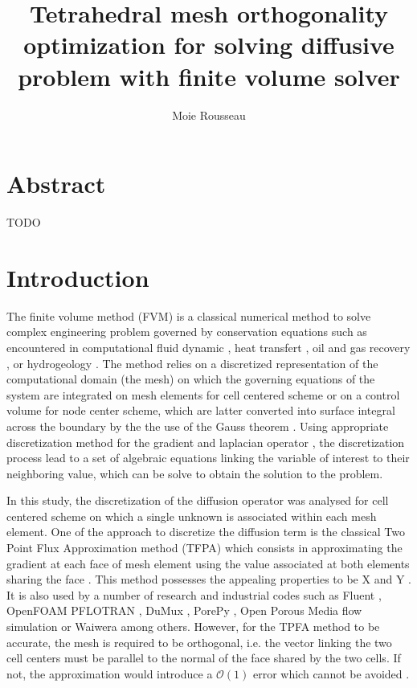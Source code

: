 \documentclass[11pt]{article}
\title{\textbf{Tetrahedral mesh orthogonality optimization for solving diffusive problem with finite volume solver}}
\author{Moie Rousseau}
\date{}
\begin{document}
\maketitle
\thispagestyle{empty}

\section*{Abstract}

TODO

\section{Introduction}


The finite volume method (FVM) is a classical numerical method to solve complex engineering problem governed by conservation equations such as encountered in computational fluid dynamic \cite{}, heat transfert \cite{}, oil and gas recovery \cite{}, or hydrogeology \cite{}.
The method relies on a discretized representation of the computational domain (the mesh) on which the governing equations of the system are integrated on mesh elements for cell centered scheme or on a control volume for node center scheme, which are latter converted into surface integral across the boundary by the the use of the Gauss theorem \cite{}. %
Using appropriate discretization method for the gradient and laplacian operator \cite{}, the discretization process lead to a set of algebraic equations linking the variable of interest to their neighboring value, which can be solve to obtain the solution to the problem.

In this study, the discretization of the diffusion operator was analysed for cell centered scheme on which a single unknown is associated within each mesh element.
One of the approach to discretize the diffusion term is the classical Two Point Flux Approximation method (TFPA) which consists in approximating the gradient at each face of mesh element using the value associated at both elements sharing the face \cite{moukalled_finite_2016, ferziger_computational_2020}.
This method possesses the appealing properties to be X and Y \cite{}. %
It is also used by a number of research and industrial codes such as Fluent \cite{}, OpenFOAM \cite{} PFLOTRAN \cite{hammond_pflotran_2012}, DuMux \cite{koch_dumux_2021}, PorePy \cite{keilegavlen_porepy_2021}, Open Porous Media flow simulation \cite{rasmussen_the_2021} or Waiwera \cite{} among others. %
However, for the TPFA method to be accurate, the mesh is required to be orthogonal, i.e. the vector linking the two cell centers must be parallel to the normal of the face shared by the two cells.
If not, the approximation would introduce a $\mathcal{O}(1)$ error which cannot be avoided \cite{}.
\end{document}
